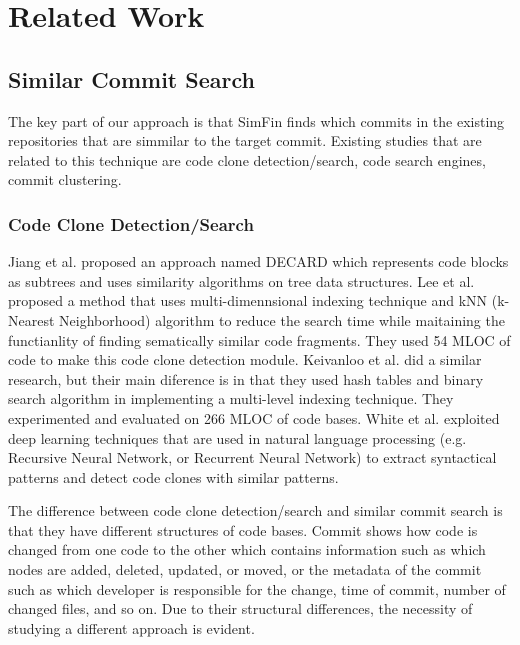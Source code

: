 \section{Related Work}
\subsection{Similar Commit Search}
The key part of our approach is that SimFin finds which commits in the existing repositories that are simmilar to the target commit. Existing studies that are related to this technique are code clone detection/search, code search engines, commit clustering.

\subsubsection{Code Clone Detection/Search}
Jiang et al. \cite{jiang2007deckard} proposed an approach named DECARD which represents code blocks as subtrees and uses similarity algorithms on tree data structures.
Lee et al. \cite{lee2010instant} proposed a method that uses multi-dimennsional indexing technique and kNN (k-Nearest Neighborhood) algorithm to reduce the search time while maitaining the functianlity of finding sematically similar code fragments.
They used 54 MLOC of code to make this code clone detection module.
Keivanloo et al. \cite{keivanloo2011internet} did a similar research, but their main diference is in that they used hash tables and binary search algorithm in implementing a multi-level indexing technique.
They experimented and evaluated on 266 MLOC of code bases.
White et al. \cite{white2016deep} exploited deep learning techniques that are used in natural language processing (e.g. Recursive Neural Network, or Recurrent Neural Network) to extract syntactical patterns and detect code clones with similar patterns. 

The difference between code clone detection/search and similar commit search is that they have different structures of code bases.
Commit shows how code is changed from one code to the other which contains information such as which nodes are added, deleted, updated, or moved, or the metadata of the commit such as which developer is responsible for the change, time of commit, number of changed files, and so on.
Due to their structural differences, the necessity of studying a different approach is evident. 

